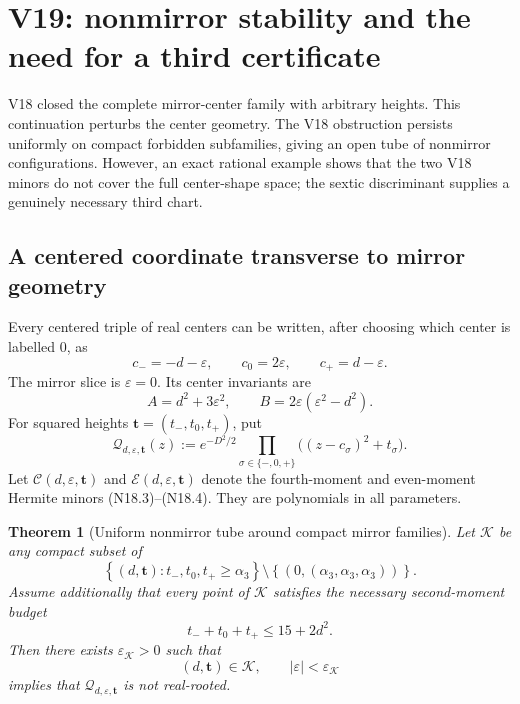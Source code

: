 \documentclass[11pt]{article}
\newtheorem{theorem}{Theorem}[section]
\theoremstyle{definition}
\theoremstyle{remark}
\begin{document}

\section{V19: nonmirror stability and the need for a third certificate}

V18 closed the complete mirror-center family with arbitrary heights.  This
continuation perturbs the center geometry.  The V18 obstruction persists
uniformly on compact forbidden subfamilies, giving an open tube of
nonmirror configurations.  However, an exact rational example shows that
the two V18 minors do not cover the full center-shape space; the sextic
discriminant supplies a genuinely necessary third chart.

\subsection{A centered coordinate transverse to mirror geometry}

Every centered triple of real centers can be written, after choosing which
center is labelled \(0\), as
\[
 c_-=-d-\varepsilon,\qquad
 c_0=2\varepsilon,\qquad
 c_+=d-\varepsilon.
 \tag{N19.1}
\]
The mirror slice is \(\varepsilon=0\).  Its center invariants are
\[
 A=d^2+3\varepsilon^2,
 \qquad
 B=2\varepsilon(\varepsilon^2-d^2).
 \tag{N19.2}
\]
For squared heights \(\mathbf t=(t_-,t_0,t_+)\), put
\[
 \mathcal Q_{d,\varepsilon,\mathbf t}(z)
 :=
 e^{-D^2/2}\prod_{\sigma\in\{-,0,+\}}
 \bigl((z-c_\sigma)^2+t_\sigma\bigr).
 \tag{N19.3}
\]
Let \(\mathcal C(d,\varepsilon,\mathbf t)\) and
\(\mathcal E(d,\varepsilon,\mathbf t)\) denote the fourth-moment and
even-moment Hermite minors \textup{(N18.3)}--\textup{(N18.4)}.
They are polynomials in all parameters.

\begin{theorem}[Uniform nonmirror tube around compact mirror families]
\label{thm:f2v19-tube}
Let \(\mathcal K\) be any compact subset of
\[
 \left\{(d,\mathbf t):
 t_-,t_0,t_+\geq\alpha_3\right\}
 \setminus
 \left\{(0,(\alpha_3,\alpha_3,\alpha_3))\right\}.
 \tag{N19.4}
\]
Assume additionally that every point of \(\mathcal K\) satisfies the
necessary second-moment budget
\[
 t_-+t_0+t_+\leq15+2d^2.
 \tag{N19.5}
\]
Then there exists \(\varepsilon_{\mathcal K}>0\) such that
\[
 (d,\mathbf t)\in\mathcal K,\qquad
 |\varepsilon|<\varepsilon_{\mathcal K}
 \tag{N19.6}
\]
implies that \(\mathcal Q_{d,\varepsilon,\mathbf t}\) is not real-rooted.
\end{theorem}
\end{document}
